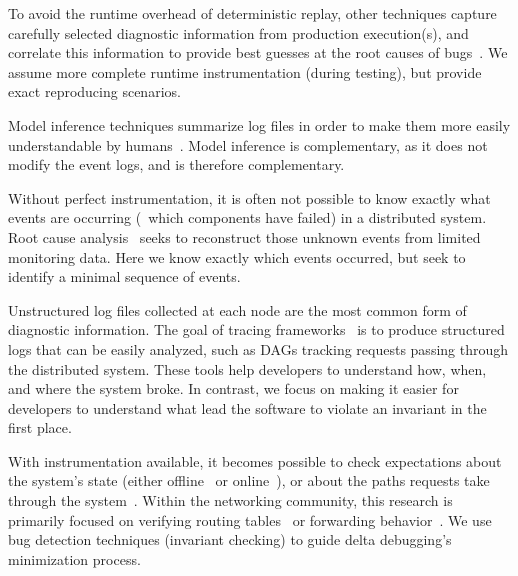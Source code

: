 { To avoid the runtime overhead of deterministic replay, other techniques
capture carefully selected diagnostic information from production execution(s), and correlate this information
to provide best guesses at the root causes of
bugs~\cite{barham2004using,Chen02pinpoint:problem,Yuan:2010:SED:1736020.1736038,kasikci2015failure,sangmin}.
We assume more complete runtime instrumentation (during testing), but provide exact reproducing
scenarios.

 Model inference techniques summarize log files
in order to make them more easily understandable by
humans~\cite{ernst2001dynamically,synoptic,csight,biermann1972synthesis,lorenzoli2008automatic,lou2010mining}.
Model inference is complementary, as it does not modify the event logs, and is therefore complementary.

Without perfect instrumentation,
it is often not possible to know exactly what events are occurring (\eg~which
 components have failed) in a
 distributed system. Root cause analysis~\cite{yemini1996,Kandula:2009:DDE:1592568.1592597}
 seeks to reconstruct those unknown events from limited monitoring data.
 Here we know exactly which events occurred, but
 seek to identify a minimal sequence of events.

 Unstructured
log files collected at each node are the most common form of diagnostic information. The goal of
tracing frameworks~\cite{pip,fonseca2007x,Chen02pinpoint:problem,ndb14,barham2004using}
is to produce structured logs that can be easily analyzed, such as DAGs tracking
requests passing through the distributed system. These tools help developers to understand
how, when, and where the system broke. In contrast, we focus on making it
easier for developers to understand what lead the software
to violate an invariant in the first place.

 With instrumentation available, it becomes possible
to check expectations about the
system's state (either offline~\cite{Liu07widschecker} or online~\cite{d3s}), or about the paths requests take through
the system~\cite{pip}. Within the networking community, this research is
primarily focused on verifying routing tables~\cite{hsa,hsa_realtime,anteater,khurshid2012veriflow}
or forwarding behavior~\cite{Zeng:2012:ATP:2413176.2413205,libra}.
We use bug detection techniques (invariant checking) to guide delta debugging's minimization
process.

}
